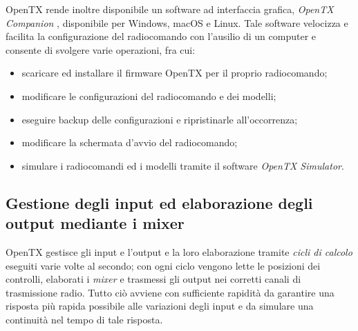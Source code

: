 \documentclass[a4paper, 12pt]{report} %
\begin{document}
OpenTX rende inoltre disponibile un software ad interfaccia grafica, \emph{OpenTX Companion} \cite{opentx-website}, disponibile per Windows, macOS e Linux. Tale software velocizza e facilita la configurazione del radiocomando con l'ausilio di un computer e consente di svolgere varie operazioni, fra cui:
\begin{itemize}
        \item scaricare ed installare il firmware OpenTX per il proprio radiocomando;
        \item modificare le configurazioni del radiocomando e dei modelli;
        \item eseguire backup delle configurazioni e ripristinarle all'occorrenza;
        \item modificare la schermata d'avvio del radiocomando;
        \item simulare i radiocomandi ed i modelli tramite il software \emph{OpenTX Simulator}.
\end{itemize}

\subsection{Gestione degli input ed elaborazione degli output mediante i mixer}\label{subsec:inputs-mixers-outputs}

OpenTX gestisce gli input e l'output e la loro elaborazione tramite \emph{cicli di calcolo} eseguiti varie volte al secondo; con ogni ciclo vengono lette le posizioni dei controlli, elaborati i \emph{mixer} e trasmessi gli output nei corretti canali di trasmissione radio. Tutto ciò avviene con sufficiente rapidità da garantire una risposta più rapida possibile alle variazioni degli input e da simulare una continuità nel tempo di tale risposta.
\end{document}
